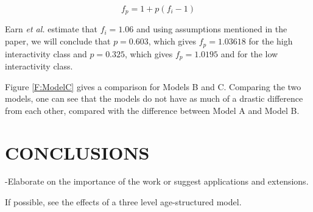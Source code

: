 \documentclass[a4paper, 12pt, journal]{ieeeconf}\usepackage[]{graphicx}\usepackage[]{color}
\begin{document}
\begin{equation}\label{Eq:f}
f_p = 1 + p(f_i - 1)
\end{equation}

Earn \textit{et al.} estimate that $f_i = 1.06$ and using assumptions mentioned in the paper, we will conclude that $p = 0.603$, which gives $f_p = 1.03618$ for the high interactivity class and $p=0.325$, which gives $f_p = 1.0195$ and for the low interactivity class.

Figure \ref{F:ModelC} gives a comparison for Models B and C. Comparing the two models, one can see that the models do not have as much of a drastic difference from each other, compared with the difference between Model A and Model B. 



\section{CONCLUSIONS}
-Elaborate on the importance of the work or suggest applications and extensions. 
 
 If possible, see the effects of a three level age-structured model.

\addtolength{\textheight}{-12cm}   %




\end{document}
